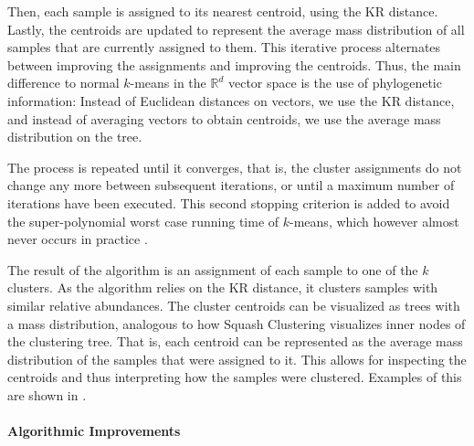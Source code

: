 Then, each sample is assigned to its nearest centroid, using the KR distance. %
Lastly, the centroids are updated to represent
the average mass distribution of all samples that are currently assigned to them.
This iterative process alternates between improving the assignments and improving the centroids.
Thus, the main difference to normal $k$-means in the $\mathbb{R}^d$ vector space is the use of phylogenetic information:
Instead of Euclidean distances on vectors, we use the KR distance,
and instead of averaging vectors to obtain centroids, we use the average mass distribution on the tree.

The process is repeated until it converges,
that is, the cluster assignments do not change any more between subsequent iterations,
or until a maximum number of iterations have been executed.
This second stopping criterion is added to avoid the super-polynomial worst case running time of $k$-means,
which however almost never occurs in practice \cite{Bottou1995,Arthur2006}.

The result of the algorithm is an assignment of each sample to one of the $k$ clusters.
As the algorithm relies on the KR distance, it clusters samples with similar relative abundances.
The cluster centroids can be visualized as trees with a mass distribution,
analogous to how Squash Clustering visualizes inner nodes of the clustering tree.
That is, each centroid can be represented as the average mass distribution of the samples that were assigned to it.
This allows for inspecting the centroids and thus interpreting how the samples were clustered.
Examples of this are shown in .


\paragraph{Algorithmic Improvements}
\label{ch:Clustering:sec:Methods:sub:PhylogeneticKmeans:par:AlgorithmicImprovements}

